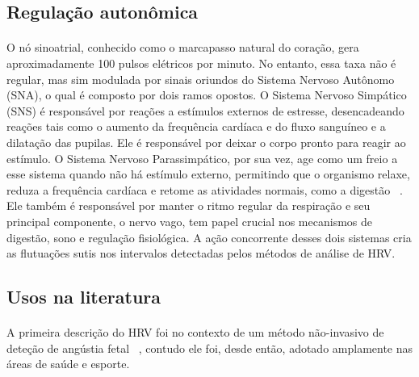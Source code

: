         \subsection {Regulação autonômica}
        
        \paragraph{} O nó sinoatrial, conhecido como o marcapasso natural do coração, gera aproximadamente 100 pulsos elétricos por minuto. No entanto, essa taxa não é regular, mas sim modulada por sinais oriundos do Sistema Nervoso Autônomo (SNA), o qual é composto por dois ramos opostos. O Sistema Nervoso Simpático (SNS) é responsável por reações a estímulos externos de estresse, desencadeando reações tais como o aumento da frequência cardíaca e do fluxo sanguíneo e a dilatação das pupilas. Ele é responsável por deixar o corpo pronto para reagir ao estímulo. O Sistema Nervoso Parassimpático, por sua vez, age como um freio a esse sistema quando não há estímulo externo, permitindo que o organismo relaxe, reduza a frequência cardíaca e retome as atividades normais, como a digestão ~\cite{Oweis2014QRSSurvey}. Ele também é responsável por manter o ritmo regular da respiração e seu principal componente, o nervo vago, tem papel crucial nos mecanismos de digestão, sono e regulação fisiológica. A ação concorrente desses dois sistemas cria as flutuações sutis nos intervalos detectadas pelos métodos de análise de HRV.
      
        \subsection {Usos na literatura}
        
            \paragraph{} A primeira descrição do HRV foi no contexto de um método não-invasivo de  deteção de angústia fetal ~\cite{Quintana2016GuidelinesCommunication}, contudo ele foi, desde então, adotado amplamente nas áreas de saúde e esporte. 
            
